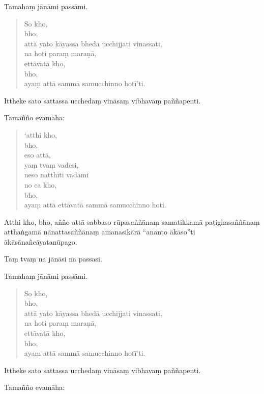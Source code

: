 \documentclass[11pt,twoside,openright]{book}
\begin{document}
\pstart
Tamahaṃ jānāmi passāmi.
\pend

\begin{verse}
So kho,\\
\vin  bho,\\
\vin  attā yato kāyassa bhedā ucchijjati vinassati,\\
\vin  na hoti paraṃ maraṇā,\\
\vin  ettāvatā kho,\\
\vin  bho,\\
\vin  ayaṃ attā sammā samucchinno hotī’ti.

\end{verse}
\pstart
Ittheke sato sattassa ucchedaṃ vināsaṃ vibhavaṃ paññapenti.
\pend

\pstart
Tamañño evamāha:
\pend

\begin{verse}
‘atthi kho,\\
\vin  bho,\\
\vin  eso attā,\\
\vin  yaṃ tvaṃ vadesi,\\
\vin  neso natthīti vadāmi\\


no ca kho,\\
\vin  bho,\\
\vin  ayaṃ attā ettāvatā sammā samucchinno hoti.

\end{verse}
\pstart
Atthi kho, bho, añño attā sabbaso rūpasaññānaṃ samatikkamā paṭighasaññānaṃ atthaṅgamā nānattasaññānaṃ amanasikārā “ananto ākāso”ti ākāsānañcāyatanūpago.
\pend

\pstart
Taṃ tvaṃ na jānāsi na passasi.
\pend

\pstart
Tamahaṃ jānāmi passāmi.
\pend

\begin{verse}
So kho,\\
\vin  bho,\\
\vin  attā yato kāyassa bhedā ucchijjati vinassati,\\
\vin  na hoti paraṃ maraṇā,\\
\vin  ettāvatā kho,\\
\vin  bho,\\
\vin  ayaṃ attā sammā samucchinno hotī’ti.

\end{verse}
\pstart
Ittheke sato sattassa ucchedaṃ vināsaṃ vibhavaṃ paññapenti.
\pend

\pstart
Tamañño evamāha:
\pend
\end{document}
